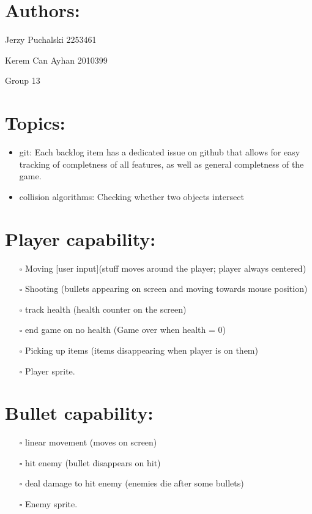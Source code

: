 \documentclass[
]{article}
\author{}
\date{}
\providecommand{\tightlist}{%
  \setlength{\itemsep}{0pt}\setlength{\parskip}{0pt}}
\begin{document}
\section{Authors:}
Jerzy Puchalski 2253461

Kerem Can Ayhan 2010399

Group 13

\section{Topics:}\label{topics}

\begin{itemize}
\tightlist
\item
  git: 
    Each backlog item has a dedicated issue on github that allows for easy tracking of completness of all features, as well as general completness of the game.
\item
  collision algorithms: Checking whether two objects intersect 
\end{itemize}

\section{Player capability:}\label{player-capability}

\begin{itemize}
\tightlist
\item[$\square$]
  Moving {[}user input{]}(stuff moves around the player; player always
  centered)
\item[$\square$]
  Shooting (bullets appearing on screen and moving towards mouse
  position)
\item[$\square$]
  track health (health counter on the screen)
\item[$\square$]
  end game on no health (Game over when health = 0)
\item[$\square$]
  Picking up items (items disappearing when player is on them)
\item[$\square$]
    Player sprite.
\end{itemize}

\section{Bullet capability:}\label{bullet-capability}

\begin{itemize}
\tightlist
\item[$\square$]
  linear movement (moves on screen)
\item[$\square$]
  hit enemy (bullet disappears on hit)
\item[$\square$]
  deal damage to hit enemy (enemies die after some bullets)
\item[$\square$]
  Enemy sprite.
\end{itemize}
\end{document}
